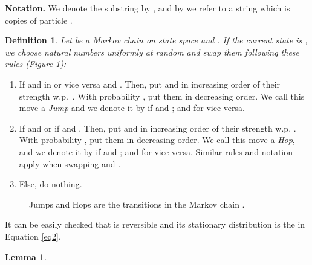 \documentclass[10 pt]{article}
\newtheorem{defin}{Definition}[section]
\newtheorem{lemma}[thm]{Lemma}
\begin{document}
\textbf{Notation.} We denote the substring  by , and by  we refer
to a string which is  copies of particle . 

\begin{defin}
Let   be a Markov chain on state space  and . If the current state is ,
we choose natural numbers  uniformly at random and swap them following these rules (Figure \ref{figJH}):
\end{defin}

\begin{enumerate}
\item If   and in  or vice versa and .  Then,
put  and   in increasing order of their strength w.p.\ .
With probability , put them in decreasing order. We call this move a \emph{Jump} and we denote
it by  if  and ; and  for vice versa. 

\item If  and     or  if  and  .
Then, put  and  in increasing order of their strength w.p. .
With probability , put them in decreasing order. We call this move a \emph{Hop},
and we denote it by   if   and ; and  for vice versa.
Similar rules and notation apply when swapping  and . 
\item Else, do nothing.
\end{enumerate}

\begin{figure}[!h]

\centerline{}
\caption{Jumps and Hops are the transitions  in the Markov chain .}\label{figJH}
\end{figure}



It can be easily checked that  is reversible and its stationary distribution is the  in Equation \ref{eq2}.

\begin{lemma}\label{lem1}

\end{lemma}
\end{document}
